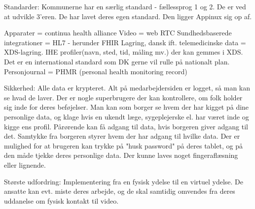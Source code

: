 Standarder:
Kommunerne har en særlig standard - fællessprog 1 og 2. De er ved at udvikle 3'eren.
De har lavet deres egen standard.
Den ligger Appinux sig op af. 

Apparater = continua health alliance
Video = web RTC
Sundhedsbaserede integrationer = HL7 - herunder FHIR
Lagring, dansk ift. telemedicinske data = XDS-lagring. IHE profiler(navn, sted, tid, måling mv.) der kan gemmes i XDS. Det er en international standard som DK gerne vil rulle på nationalt plan.
Personjournal = PHMR (personal health monitoring record)



Sikkerhed:
Alle data er krypteret.
Alt på medarbejdersiden er logget, så man kan se hvad de laver. 
Der er nogle superbrugere der kan kontrollere, om folk holder sig inde for deres beføjelser. 
Man kan som borger se hvem der har kigget på dine personlige data, og klage hvis en ukendt læge, sygeplejerske el. har været inde og kigge ens profil.
Pårørende kan få adgang til data, hvis borgeren giver adgang til det. 
Samtykke fra borgeren styrer hvem der har adgang til hvilke data.
Der er mulighed for at brugeren kan trykke på "husk password" på deres tablet, og på den måde tjekke deres personlige data. Der kunne laves noget fingeraflæsning eller lignende. 


Største udfordring:
Implementering fra en fysisk ydelse til en virtuel ydelse.
De ansatte kan evt. miste deres arbejde, og de skal samtidig omvendes fra deres uddanelse om fysisk kontakt til video.




